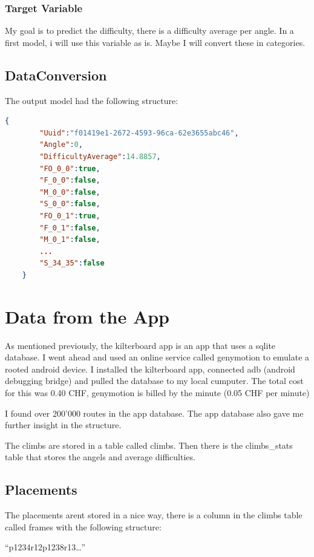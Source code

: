 \documentclass{article}
\begin{document}
\subsubsection{Target Variable}
My goal is to predict the difficulty, there is a difficulty average per angle. In a first model, i will use this variable as is.
Maybe I will convert these in categories.


\subsection{DataConversion}

The output model had the following structure:


\begin{lstlisting}[language=json, caption={Example of one crawled Entry}]
    {
        "Uuid":"f01419e1-2672-4593-96ca-62e3655abc46",
        "Angle":0,
        "DifficultyAverage":14.8857,
        "FO_0_0":true,
        "F_0_0":false,
        "M_0_0":false,
        "S_0_0":false,
        "FO_0_1":true,
        "F_0_1":false,
        "M_0_1":false,
        ...
        "S_34_35":false
    }
\end{lstlisting}

\FloatBarrier
\section{Data from the App}
As mentioned previously, the kilterboard app is an app that uses a sqlite database. 
I went ahead and used an online service called genymotion to emulate a rooted android device.
I installed the kilterboard app, connected adb (android debugging bridge) and pulled the database to my local cumputer.
The total cost for this was 0.40 CHF, genymotion is billed by the minute (0.05 CHF per minute)

I found over 200'000 routes in the app database. The app database also gave me further insight in the structure.

The climbs are stored in a table called climbs. Then there is the climbs\_stats table that stores the angels and average difficulties.

\subsection{Placements}
The placements arent stored in a nice way, there is a column in the climbs table called frames with the following structure:

``p1234r12p1238r13\dots'' 
\end{document}

